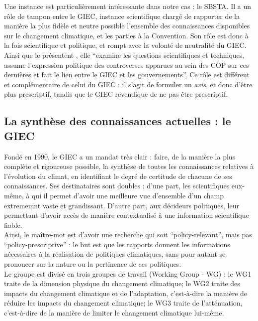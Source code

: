 Une instance est particulièrement intéressante dans notre cas : le \Gls{SBSTA}. Il a un rôle de tampon entre le \Gls{GIEC}, instance scientifique chargé de rapporter de la manière la plus fidèle et neutre possible l'ensemble des connaissances disponibles sur le changement climatique, et les parties à la Convention. Son rôle est donc à la fois scientifique et politique, et rompt avec la volonté de neutralité du \Gls{GIEC}. Ainsi que le présentent \textcite{aykut_gouverner_2015}, elle \enquote{examine les questions scientifiques et techniques, assume l’expression politique des controverses apparues au sein des COP sur ces dernières et fait le lien entre le \Gls{GIEC} et les gouvernements}. Ce rôle est différent et complémentaire de celui du \Gls{GIEC} : il s'agit de formuler un \emph{avis}, et donc d'être plus prescriptif, tandis que le \Gls{GIEC} revendique de ne pas être prescriptif.  \\




\subsection{La synthèse des connaissances actuelles : le GIEC}
\label{sect:1.2.3}

Fondé en 1990, le \Gls{GIEC} a un mandat très clair : faire, de la manière la plus complète et rigoureuse possible, la synthèse de toutes les connaissances relatives à l'évolution du climat, en identifiant le degré de certitude de chacune de ses connaissances. Ses destinataires sont doubles : d'une part, les scientifiques eux-même, à qui il permet d'avoir une meilleure vue d'ensemble d'un champ extrememnt vaste et grandissant. D'autre part, aux décideurs politiques, leur permettant d'avoir accès de manière contextualisé à une information scientifique fiable. \\

Ainsi, le maître-mot est d'avoir une recherche qui soit \enquote{policy-relevant}, mais pas \enquote{policy-prescriptive} : le but est que les rapports donnent les informations nécessaires à la réalisation de politiques climatiques, sans pour autant se prononcer sur la nature ou la pertinence de ces politiques. \\

Le groupe est divisé en trois groupes de travail (Working Group - WG)  : le WG1 traite de la dimension physique du changement climatique; le WG2 traite des impacts du changement climatique et de l'adaptation, c'est-à-dire la manière de réduire les impacts du changement climatique; le WG3 traite de l'atténuation, c'est-à-dire de la manière de limiter le changement climatique lui-même. 



